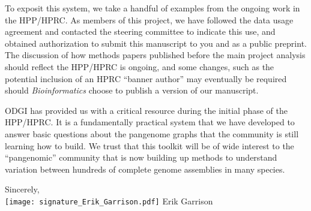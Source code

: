\documentclass[12pt,hidelinks,letterpaper]{article}
\begin{document}
To exposit this system, we take a handful of examples from the ongoing work in the HPP/HPRC.
As members of this project, we have followed the data usage agreement and contacted the steering committee to indicate this use, and obtained authorization to submit this manuscript to you and as a public preprint.
The discussion of how methods papers published before the main project analysis should reflect the HPP/HPRC is ongoing, and some changes, such as the potential inclusion of an HPRC ``banner author'' may eventually be required should \textit{Bioinformatics} choose to publish a version of our manuscript.

ODGI has provided us with a critical resource during the initial phase of the HPP/HPRC.
It is a fundamentally practical system that we have developed to answer basic questions about the pangenome graphs that the community is still learning how to build.
We trust that this toolkit will be of wide interest to the ``pangenomic'' community that is now building up methods to understand variation between hundreds of complete genome assemblies in many species.


\hfill \break

\indent Sincerely,\\
\texttt{[image: signature\_Erik\_Garrison.pdf]}
\hfill \break
\indent Erik Garrison



\begin{comment}
\hfill \break
\begingroup
\let\oldthebibliography\thebibliography
\let\endoldthebibliography\endthebibliography
\renewenvironment{thebibliography}[1]{
  \begin{oldthebibliography}{#1}
    \setlength{\itemsep}{0em}
    \setlength{\parskip}{0em}
}
{
  \end{oldthebibliography}
}
\renewcommand{\section}[2]{}%

{\small }
\endgroup
\end{comment}
\end{document}
